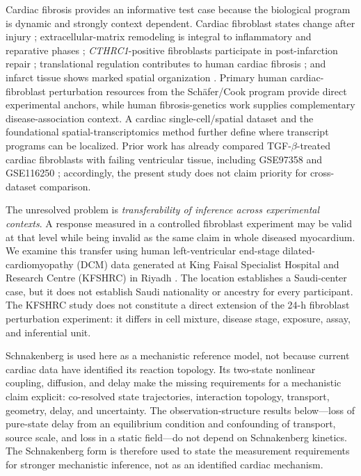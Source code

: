 \documentclass[preprint,11pt]{elsarticle}
\newcommand{\cthrc}{\textit{CTHRC1}}
\newcommand{\kfs}{King Faisal Specialist Hospital and Research Centre (KFSHRC)}
\begin{document}
Cardiac fibrosis provides an informative test case because the biological program is dynamic and strongly context dependent. Cardiac fibroblast states change after injury \cite{Tallquist2017,Farbehi2019}; extracellular-matrix remodeling is integral to inflammatory and reparative phases \cite{Dobaczewski2010,Frangogiannis2019}; \cthrc-positive fibroblasts participate in post-infarction repair \cite{RuizVillalba2020}; translational regulation contributes to human cardiac fibrosis \cite{Chothani2019}; and infarct tissue shows marked spatial organization \cite{Kuppe2022}. Primary human cardiac-fibroblast perturbation resources from the Sch\"afer/Cook program \cite{Schafer2017} provide direct experimental anchors, while human fibrosis-genetics work \cite{Nauffal2023} supplies complementary disease-association context. A cardiac single-cell/spatial dataset \cite{Hernandez2026} and the foundational spatial-transcriptomics method \cite{Stahl2016} further define where transcript programs can be localized. Prior work has already compared TGF-$\beta$-treated cardiac fibroblasts with failing ventricular tissue, including GSE97358 and GSE116250 \cite{Gao2021}; accordingly, the present study does not claim priority for cross-dataset comparison.

The unresolved problem is \emph{transferability of inference across experimental contexts}. A response measured in a controlled fibroblast experiment may be valid at that level while being invalid as the same claim in whole diseased myocardium. We examine this transfer using human left-ventricular end-stage dilated-cardiomyopathy (DCM) data generated at \kfs{} in Riyadh \cite{Colak2009,Colak2016}. The location establishes a Saudi-center case, but it does not establish Saudi nationality or ancestry for every participant. The KFSHRC study does not constitute a direct extension of the 24-h fibroblast perturbation experiment: it differs in cell mixture, disease stage, exposure, assay, and inferential unit.

Schnakenberg is used here as a mechanistic reference model, not because current cardiac data have identified its reaction topology. Its two-state nonlinear coupling, diffusion, and delay make the missing requirements for a mechanistic claim explicit: co-resolved state trajectories, interaction topology, transport, geometry, delay, and uncertainty. The observation-structure results below---loss of pure-state delay from an equilibrium condition and confounding of transport, source scale, and loss in a static field---do not depend on Schnakenberg kinetics. The Schnakenberg form is therefore used to state the measurement requirements for stronger mechanistic inference, not as an identified cardiac mechanism.
\end{document}
